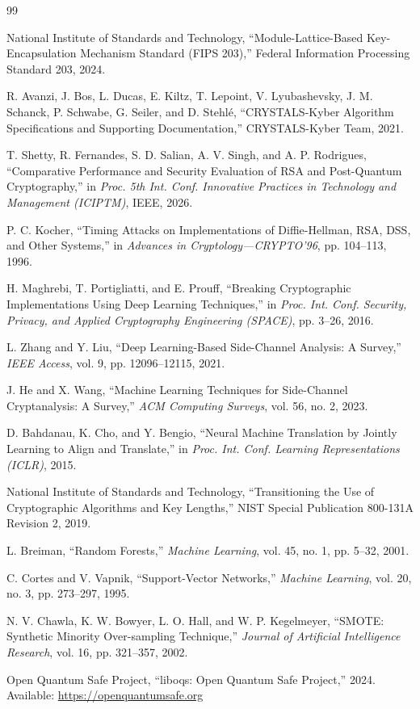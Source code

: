 \documentclass[conference]{IEEEtran}
\begin{document}
\begin{thebibliography}{99}

National Institute of Standards and Technology,
``Module-Lattice-Based Key-Encapsulation Mechanism Standard (FIPS 203),''
Federal Information Processing Standard 203, 2024.

R. Avanzi, J. Bos, L. Ducas, E. Kiltz, T. Lepoint, V. Lyubashevsky,
J. M. Schanck, P. Schwabe, G. Seiler, and D. Stehl{\'e},
``CRYSTALS-Kyber Algorithm Specifications and Supporting Documentation,''
CRYSTALS-Kyber Team, 2021.

T. Shetty, R. Fernandes, S. D. Salian, A. V. Singh, and A. P. Rodrigues,
``Comparative Performance and Security Evaluation of RSA and Post-Quantum Cryptography,''
in \textit{Proc. 5th Int. Conf. Innovative Practices in Technology and Management (ICIPTM)}, IEEE, 2026.

P. C. Kocher,
``Timing Attacks on Implementations of Diffie-Hellman, RSA, DSS, and Other Systems,''
in \textit{Advances in Cryptology—CRYPTO'96},
pp. 104--113, 1996.

H. Maghrebi, T. Portigliatti, and E. Prouff,
``Breaking Cryptographic Implementations Using Deep Learning Techniques,''
in \textit{Proc. Int. Conf. Security, Privacy, and Applied Cryptography Engineering (SPACE)},
pp. 3--26, 2016.

L. Zhang and Y. Liu,
``Deep Learning-Based Side-Channel Analysis: A Survey,''
\textit{IEEE Access},
vol. 9,
pp. 12096--12115,
2021.

J. He and X. Wang,
``Machine Learning Techniques for Side-Channel Cryptanalysis: A Survey,''
\textit{ACM Computing Surveys},
vol. 56,
no. 2,
2023.

D. Bahdanau, K. Cho, and Y. Bengio,
``Neural Machine Translation by Jointly Learning to Align and Translate,''
in \textit{Proc. Int. Conf. Learning Representations (ICLR)},
2015.

National Institute of Standards and Technology,
``Transitioning the Use of Cryptographic Algorithms and Key Lengths,''
NIST Special Publication 800-131A Revision 2,
2019.

L. Breiman,
``Random Forests,''
\textit{Machine Learning},
vol. 45,
no. 1,
pp. 5--32,
2001.

C. Cortes and V. Vapnik,
``Support-Vector Networks,''
\textit{Machine Learning},
vol. 20,
no. 3,
pp. 273--297,
1995.

N. V. Chawla, K. W. Bowyer, L. O. Hall, and W. P. Kegelmeyer,
``SMOTE: Synthetic Minority Over-sampling Technique,''
\textit{Journal of Artificial Intelligence Research},
vol. 16,
pp. 321--357,
2002.

Open Quantum Safe Project,
``liboqs: Open Quantum Safe Project,''
2024.
Available: \url{https://openquantumsafe.org}

\end{thebibliography}
\end{document}

